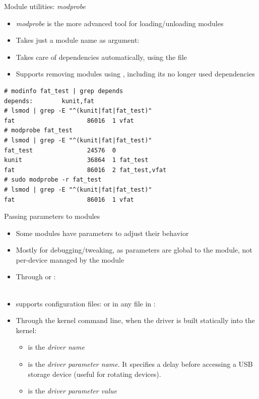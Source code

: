 \begin{frame}[fragile]{Module utilities: {\em modprobe}}
  \begin{itemize}
  \item {\em modprobe} is the more advanced tool for loading/unloading
    modules
  \item Takes just a module name as argument: 
  \item Takes care of dependencies automatically, using the
     file
  \item Supports removing modules using , including
    its no longer used dependencies
  \end{itemize}

  \begin{block}{}
    {\footnotesize
\begin{verbatim}
# modinfo fat_test | grep depends
depends:        kunit,fat
# lsmod | grep -E "^(kunit|fat|fat_test)"
fat                    86016  1 vfat
# modprobe fat_test
# lsmod | grep -E "^(kunit|fat|fat_test)"
fat_test               24576  0
kunit                  36864  1 fat_test
fat                    86016  2 fat_test,vfat
# sudo modprobe -r fat_test
# lsmod | grep -E "^(kunit|fat|fat_test)"
fat                    86016  1 vfat
\end{verbatim}
    }
  \end{block}
\end{frame}

\begin{frame}{Passing parameters to modules}
  \small
  \begin{itemize}
  \item Some modules have parameters to adjust their behavior
  \item Mostly for debugging/tweaking, as parameters are global to the
    module, not per-device managed by the module
  \item Through  or :\\
    \\
  \item {} supports configuration files:  or in any file in :\\
  \item Through the kernel command line, when the driver is built statically into the kernel:\\
    \begin{itemize}
    \item {} is the {\em driver name}
    \item {} is the {\em driver parameter name}. It
      specifies a delay before accessing a USB storage device (useful for
      rotating devices).
    \item {} is the {\em driver parameter value}
    \end{itemize}
  \end{itemize}
\end{frame}

